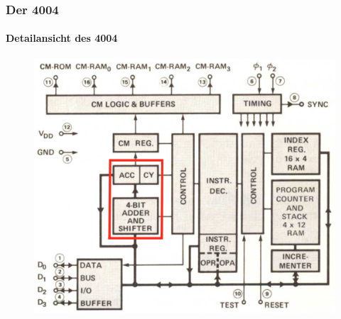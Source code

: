 \begin{frame}
	\frametitle{Der 4004}
	\framesubtitle{Detailansicht des 4004}
	\begin{figure}[ht]
		\includegraphics[width=0.7\linewidth]{images/layout_4004_3.png}
	\end{figure}
\end{frame}

